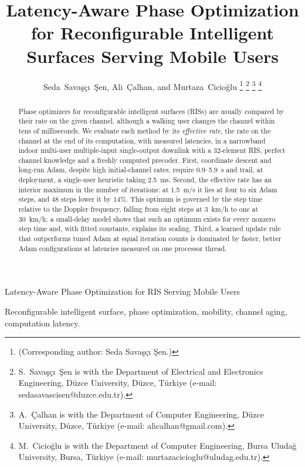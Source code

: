 \documentclass[journal]{IEEEtran}
\begin{document}
\title{Latency-Aware Phase Optimization for Reconfigurable Intelligent Surfaces Serving Mobile Users}

\author{Seda~Savaşçı~Şen, Ali~Çalhan, and Murtaza~Cicioğlu%
\thanks{(Corresponding author: Seda Savaşçı Şen.)}%
\thanks{S.~Savaşçı~Şen is with the Department of Electrical and Electronics Engineering, Düzce University, Düzce, Türkiye (e-mail: sedasavascisen@duzce.edu.tr).}%
\thanks{A.~Çalhan is with the Department of Computer Engineering, Düzce University, Düzce, Türkiye (e-mail: alicalhan@gmail.com).}%
\thanks{M.~Cicioğlu is with the Department of Computer Engineering, Bursa Uludağ University, Bursa, Türkiye (e-mail: murtazacicioglu@uludag.edu.tr).}}

%
{Latency-Aware Phase Optimization for RIS Serving Mobile Users}

\maketitle

\begin{abstract}
Phase optimizers for reconfigurable intelligent surfaces (RISs) are usually compared by their rate on the given channel, although a walking user changes the channel within tens of milliseconds. We evaluate each method by its \emph{effective rate}, the rate on the channel at the end of its computation, with measured latencies, in a narrowband indoor multi-user multiple-input single-output downlink with a 32-element RIS, perfect channel knowledge and a freshly computed precoder. First, coordinate descent and long-run Adam, despite high initial-channel rates, require 0.9--5.9~s and trail, at deployment, a single-user heuristic taking 2.5~ms. Second, the effective rate has an interior maximum in the number of iterations: at 1.5~m/s it lies at four to six Adam steps, and 48 steps lower it by 14\%. This optimum is governed by the step time relative to the Doppler frequency, falling from eight steps at 3~km/h to one at 30~km/h; a small-delay model shows that such an optimum exists for every nonzero step time and, with fitted constants, explains its scaling. Third, a learned update rule that outperforms tuned Adam at equal iteration counts is dominated by faster, better Adam configurations at latencies measured on one processor thread.
\end{abstract}

\begin{IEEEkeywords}
Reconfigurable intelligent surface, phase optimization, mobility, channel aging, computation latency.
\end{IEEEkeywords}
\end{document}
